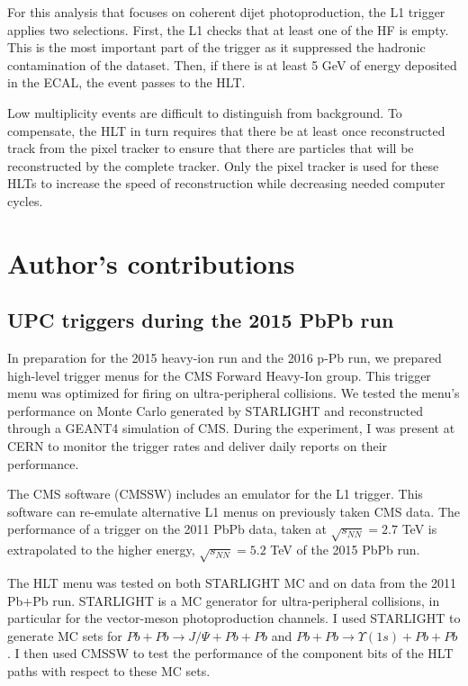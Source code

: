 For this analysis that focuses on coherent dijet photoproduction, the L1 trigger applies two selections. First, the L1 checks that at least one of the HF is empty. This is the most important part of the trigger as it suppressed the hadronic contamination of the dataset. Then, if there is at least 5 GeV of energy deposited in the ECAL, the event passes to the HLT. 

Low multiplicity events are difficult to distinguish from background. To compensate, the HLT in turn requires that there be at least once reconstructed track from the pixel tracker to ensure that there are particles that will be reconstructed by the complete tracker. Only the pixel tracker is used for these HLTs to increase the speed of reconstruction while decreasing needed computer cycles. 

\section{Author's contributions}

\subsection{UPC triggers during the 2015 PbPb run}
In preparation for the 2015 heavy-ion run and the 2016 p-Pb run, we prepared high-level trigger menus for the CMS Forward Heavy-Ion group. This trigger menu was optimized for firing on ultra-peripheral collisions. We tested the menu's performance on Monte Carlo generated by STARLIGHT and reconstructed through a GEANT4 simulation of CMS. During the experiment, I was present at CERN to monitor the trigger rates and deliver daily reports on their performance. 

The CMS software (CMSSW) includes an emulator for the L1 trigger. This software can re-emulate alternative L1 menus on previously taken CMS data. The performance of a trigger on the 2011 PbPb data, taken at $\sqrt{s_{NN}} = 2.7$ TeV is extrapolated to the higher energy, $\sqrt{s_{NN}} = 5.2$ TeV of the 2015 PbPb run.

The HLT menu was tested on both STARLIGHT MC and on data from the 2011 Pb+Pb run. STARLIGHT is a MC generator for ultra-peripheral collisions, in particular for the vector-meson photoproduction channels. I used STARLIGHT to generate MC sets for $Pb+Pb\rightarrow J/\Psi+Pb+Pb$ and $Pb+Pb\rightarrow \Upsilon(1s)+Pb+Pb$. I then used CMSSW to test the performance of the component bits of the HLT paths with respect to these MC sets. 

